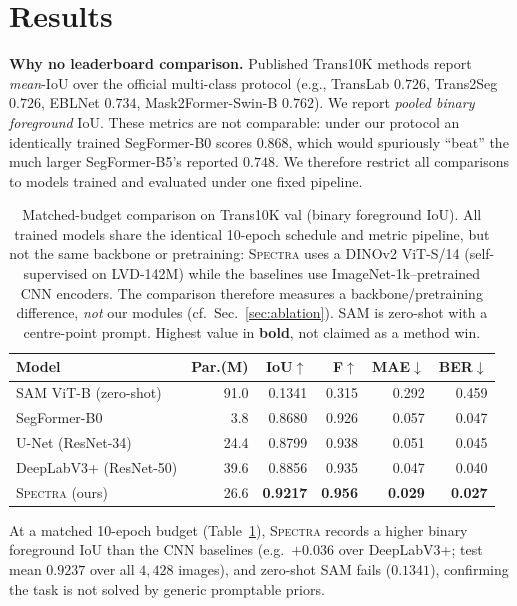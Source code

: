 \documentclass{bmvc2k}
\newcommand{\spectra}{\textsc{Spectra}}
\newcommand{\dinov}{DINOv2}
\newcommand{\iou}{IoU}
\newcommand{\best}[1]{\textbf{#1}}
\begin{document}
\section{Results}
\label{sec:results}
\textbf{Why no leaderboard comparison.} Published Trans10K methods report
\emph{mean}-\iou{} over the official multi-class protocol (e.g., TransLab
$0.726$, Trans2Seg $0.726$, EBLNet $0.734$, Mask2Former-Swin-B $0.762$). We
report \emph{pooled binary foreground} \iou. These metrics are not comparable:
under our protocol an identically trained SegFormer-B0 scores $0.868$, which
would spuriously ``beat'' the much larger SegFormer-B5's reported $0.748$. We
therefore restrict all comparisons to models trained and evaluated under one
fixed pipeline.

\begin{table}[t]
\centering
\caption{Matched-budget comparison on Trans10K val (binary foreground
\iou). All trained models share the identical 10-epoch schedule and metric
pipeline, but not the same backbone or pretraining: \spectra{} uses a
\dinov{} ViT-S/14 (self-supervised on LVD-142M) while the baselines use
ImageNet-1k--pretrained CNN encoders. The comparison therefore measures a
backbone/pretraining difference, \emph{not} our modules (cf.\ Sec.~\ref{sec:ablation}).
SAM is zero-shot with a centre-point prompt. Highest value in \textbf{bold}, not
claimed as a method win.}
\label{tab:main}
\setlength{\tabcolsep}{4.5pt}
\begin{tabular}{lrrrrr}
\toprule
Model & Par.(M) & \iou$\uparrow$ & F$\uparrow$ & MAE$\downarrow$ & BER$\downarrow$ \\
\midrule
SAM ViT-B (zero-shot) & 91.0 & 0.1341 & 0.315 & 0.292 & 0.459 \\
SegFormer-B0 & 3.8 & 0.8680 & 0.926 & 0.057 & 0.047 \\
U-Net (ResNet-34) & 24.4 & 0.8799 & 0.938 & 0.051 & 0.045 \\
DeepLabV3+ (ResNet-50) & 39.6 & 0.8856 & 0.935 & 0.047 & 0.040 \\
\spectra{} (ours) & 26.6 & \best{0.9217} & \best{0.956} & \best{0.029} & \best{0.027} \\
\bottomrule
\end{tabular}
\end{table}

At a matched 10-epoch budget (Table~\ref{tab:main}), \spectra{} records a higher
binary foreground \iou{} than the CNN baselines (e.g.\ $+0.036$ over DeepLabV3+;
test mean $0.9237$ over all $4{,}428$ images), and zero-shot SAM fails
($0.1341$), confirming the task is not solved by generic promptable priors.
\end{document}
